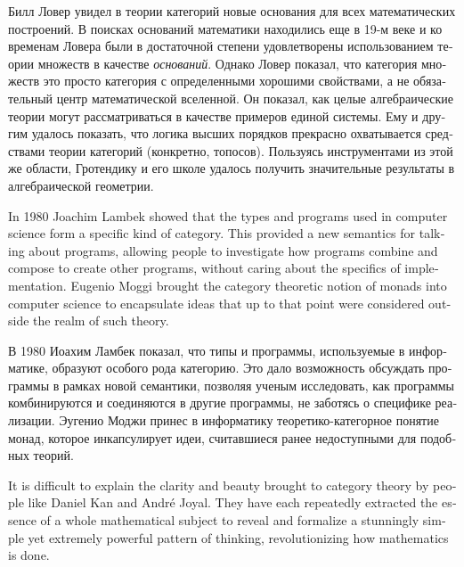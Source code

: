 \documentclass[a4paper]{book}
\theoremstyle{myth}
\begin{document}
\begin{english}
\begin{russian}Билл Ловер увидел в теории категорий новые основания для всех математических построений. В поисках оснований математики находились еще в 19-м веке и ко временам Ловера были в достаточной степени удовлетворены использованием теории множеств в качестве {\em оснований}. Однако Ловер показал, что категория множеств это просто категория с определенными хорошими свойствами, а не обязательный центр математической вселенной. Он показал, как целые алгебраические теории могут рассматриваться в качестве примеров единой системы. Ему и другим удалось показать, что логика высших порядков прекрасно охватывается средствами теории категорий (конкретно, топосов). Пользуясь инструментами из этой же области, Гротендику и его школе удалось получить значительные результаты в алгебраической геометрии. \end{russian}

In 1980 Joachim Lambek showed that the types and programs used in computer science form a specific kind of category. This provided a new semantics for talking about programs, allowing people to investigate how programs combine and compose to create other programs, without caring about the specifics of implementation. Eugenio Moggi brought the category theoretic notion of monads into computer science to encapsulate ideas that up to that point were considered outside the realm of such theory.

\begin{russian}В 1980 Иоахим Ламбек показал, что типы и программы, используемые в информатике, образуют особого рода категорию. Это дало возможность обсуждать программы в рамках новой семантики, позволяя ученым исследовать, как программы комбинируются и соединяются в другие программы, не заботясь о специфике реализации. Эугенио Моджи принес в информатику теоретико-категорное понятие монад, которое инкапсулирует идеи, считавшиеся ранее недоступными для подобных теорий. \end{russian}

It is difficult to explain the clarity and beauty brought to category theory by people like Daniel Kan and Andr\'{e} Joyal. They have each repeatedly extracted the essence of a whole mathematical subject to reveal and formalize a stunningly simple yet extremely powerful pattern of thinking, revolutionizing how mathematics is done.


\end{english}
\end{document}
